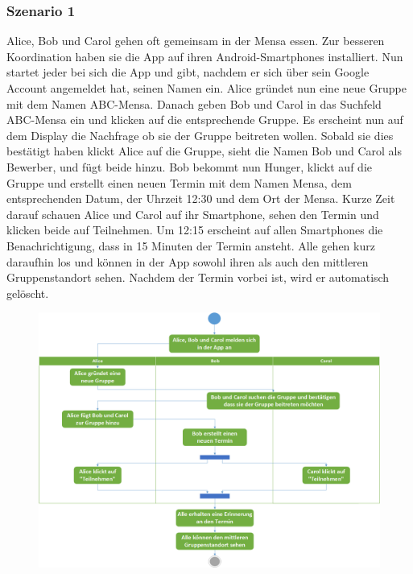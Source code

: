 \documentclass{scrartcl}
\begin{document}
	\subsubsection{Szenario 1}
	Alice, Bob und Carol gehen oft gemeinsam in der Mensa essen. Zur besseren Koordination haben sie die App auf ihren Android-Smartphones installiert.
	Nun startet jeder bei sich die App und gibt, nachdem er sich über sein Google Account angemeldet hat, seinen Namen ein.
	Alice gründet nun eine neue Gruppe mit dem Namen ABC-Mensa. Danach geben Bob und Carol in das Suchfeld ABC-Mensa ein und klicken auf die entsprechende Gruppe.
	Es erscheint nun auf dem Display die Nachfrage ob sie der Gruppe beitreten wollen. Sobald sie dies bestätigt haben klickt Alice auf die Gruppe,
	sieht die Namen Bob und Carol als Bewerber, und fügt beide hinzu.
	Bob bekommt nun Hunger, klickt auf die Gruppe und erstellt einen neuen Termin mit dem Namen Mensa, dem entsprechenden Datum, der Uhrzeit 12:30 und dem Ort der Mensa.
	Kurze Zeit darauf schauen Alice und Carol auf ihr Smartphone, sehen den Termin und klicken beide auf \glqq{}Teilnehmen\grqq{}.
	Um 12:15 erscheint auf allen Smartphones die Benachrichtigung, dass in 15 Minuten der Termin ansteht.
	Alle gehen kurz daraufhin los und können in der App sowohl ihren als auch den mittleren Gruppenstandort sehen.
	Nachdem der Termin vorbei ist, wird er automatisch gelöscht.
	\newline
	\newline
	\begin{figure}[h]
	\centering
	\includegraphics[width=\textwidth]{Szenario1}
	\end{figure}
	
\end{document}
